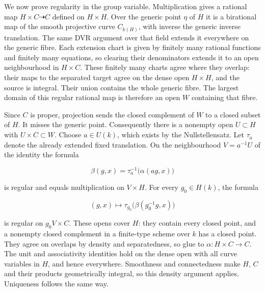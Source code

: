 \documentclass[11pt,a4paper,openany]{report}
\newcounter{none}
\begin{document}
We now prove regularity in the group variable. Multiplication gives a rational map \(H\times C\dashrightarrow C\) defined on \(H\times H\). Over the generic point \(\eta\) of \(H\) it is a birational map of the smooth projective curve \(C_{k(H)}\), with inverse the generic inverse translation. The same DVR argument over that field extends it everywhere on the generic fibre. Each extension chart is given by finitely many rational functions and finitely many equations, so clearing their denominators extends it to an open neighbourhood in \(H\times C\). These finitely many charts agree where they overlap: their maps to the separated target agree on the dense open \(H\times H\), and the source is integral. Their union contains the whole generic fibre. The largest domain of this regular rational map is therefore an open \(W\) containing that fibre.

Since \(C\) is proper, projection sends the closed complement of \(W\) to a closed subset of \(H\). It misses the generic point. Consequently there is a nonempty open \(U\subset H\) with \(U\times C\subset W\). Choose \(a\in U(k)\), which exists by the Nullstellensatz. Let \(\tau_a\) denote the already extended fixed translation. On the neighbourhood \(V=a^{-1}U\) of the identity the formula

\[
\beta(g,x)=\tau_a^{-1}\bigl(\alpha(ag,x)\bigr)
\]

is regular and equals multiplication on \(V\times H\). For every \(g_0\in H(k)\), the formula

\[
(g,x)\longmapsto\tau_{g_0}\bigl(\beta(g_0^{-1}g,x)\bigr)
\]

is regular on \(g_0V\times C\). These opens cover \(H\): they contain every closed point, and a nonempty closed complement in a finite-type scheme over \(k\) has a closed point. They agree on overlaps by density and separatedness, so glue to \(\alpha:H\times C\to C\). The unit and associativity identities hold on the dense open with all curve variables in \(H\), and hence everywhere. Smoothness and connectedness make \(H\), \(C\) and their products geometrically integral, so this density argument applies. Uniqueness follows the same way.
\end{document}
